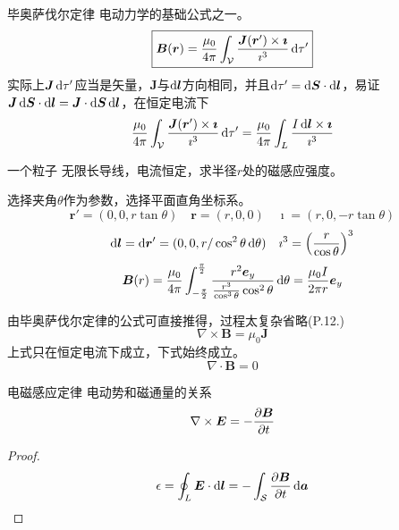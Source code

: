 \documentclass{mynote}
\begin{document}
\begin{theorem}{毕奥萨伐尔定律}
    电动力学的基础公式之一。
    \[
    \boxed{
    \boldsymbol{B}(\boldsymbol{r}) = \frac{\mu_0}{4 \pi} \int_{\mathcal{V}} \frac{\boldsymbol{J}(\boldsymbol{r}') \times \boldsymbol{\imath}}{\imath^3} \mathop{}\!\mathrm{d} \tau'    }
    \]
    实际上$\boldsymbol{J} \mathop{}\!\mathrm{d} \tau'$应当是矢量，$\bm{J}$与$\mathop{}\!\mathrm{d} \boldsymbol{l}$方向相同，并且$\mathop{}\!\mathrm{d} \tau' = \mathop{}\!\mathrm{d} \boldsymbol{S} \cdot \mathop{}\!\mathrm{d} \boldsymbol{l}$，易证$\boldsymbol{J} \mathop{}\!\mathrm{d} \boldsymbol{S} \cdot \mathop{}\!\mathrm{d} \boldsymbol{l} = \boldsymbol{J}  \cdot  \mathop{}\!\mathrm{d} \boldsymbol{S} \mathop{}\!\mathrm{d} \boldsymbol{l} $，在恒定电流下
    \[
        \frac{\mu_0}{4 \pi} \int_{\mathcal{V}} \frac{\boldsymbol{J}(\boldsymbol{r}') \times \boldsymbol{\imath}}{\imath^3} \mathop{}\!\mathrm{d} \tau'  = \frac{\mu_0}{4 \pi} \int_{L} \frac{I \mathop{}\!\mathrm{d} \boldsymbol{l} \times \boldsymbol{\imath}}{\imath^3}
    \]
\end{theorem}
\begin{problem}{一个粒子}
    无限长导线，电流恒定，求半径$r$处的磁感应强度。
\end{problem}
\begin{solution}
    选择夹角$\theta$作为参数，选择平面直角坐标系。
    \[
    \bm{r}' = (0, 0, r \tan \theta) \quad \bm{r} = (r, 0, 0) \quad \bm{\imath} = (r, 0, - r \tan \theta)
    \]
    \[
    \mathop{}\!\mathrm{d} \boldsymbol{l} = \mathop{}\!\mathrm{d} \boldsymbol{r}' = (0, 0, r/\cos^2 \theta \mathop{}\!\mathrm{d} \theta) \quad \imath^3 = \left( \frac{r}{\cos \theta} \right) ^3
    \]
    \[
    \boldsymbol{B}(r) = \frac{\mu_0}{4 \pi} \int_{-\frac{\pi}{2}}^{\frac{\pi}{2}} \dfrac{r^2 \boldsymbol{e}_y }{\frac{r^3}{\cos^3 \theta} \cos^2 \theta} \mathop{}\!\mathrm{d} \theta  = \frac{\mu_0 I}{2\pi r} \boldsymbol{e}_y
    \]
\end{solution}






\begin{proposition}
    由毕奥萨伐尔定律的公式可直接推得，过程太复杂省略(P.12.)
    \[
    \nabla \times \bm{B} = \mu_0 \bm{J}
    \]
    上式只在恒定电流下成立，下式始终成立。
    \[
    \nabla \cdot \bm{B} = 0    
    \]
\end{proposition}





\begin{theorem}{电磁感应定律}
    电动势和磁通量的关系
    \[
    \nabla \times \boldsymbol{E} = -\dfrac{\partial \boldsymbol{B}}{\partial t}    
    \]  
\end{theorem}
\begin{proof}
    \[
        \epsilon = \oint_L \boldsymbol{E} \cdot \mathop{}\!\mathrm{d} \boldsymbol{l} = -\int_{\mathcal{S}} \dfrac{\partial \boldsymbol{B}}{\partial t} \mathop{}\!\mathrm{d} \boldsymbol{a}
    \]
\end{proof}
\end{document}
